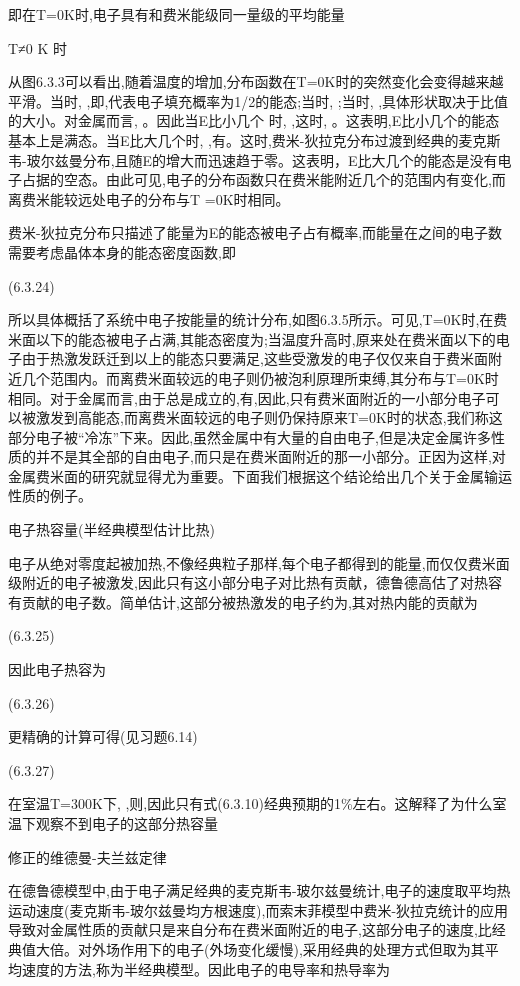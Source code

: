 即在T=0K时,电子具有和费米能级同一量级的平均能量

T≠0 K 时

从图6.3.3可以看出,随着温度的增加,分布函数在T=0K时的突然变化会变得越来越平滑。当时, ,即,代表电子填充概率为1/2的能态;当时, ;当时, ,具体形状取决于比值的大小。对金属而言, 。因此当E比小几个 时, ,这时, 。这表明,E比小几个的能态基本上是满态。当E比大几个时, ,有。这时,费米-狄拉克分布过渡到经典的麦克斯韦-玻尔兹曼分布,且随E的增大而迅速趋于零。这表明，E比大几个的能态是没有电子占据的空态。由此可见,电子的分布函数只在费米能附近几个的范围内有变化,而离费米能较远处电子的分布与T =0K时相同。

费米-狄拉克分布只描述了能量为E的能态被电子占有概率,而能量在之间的电子数需要考虑晶体本身的能态密度函数,即

 	(6.3.24)



所以具体概括了系统中电子按能量的统计分布,如图6.3.5所示。可见,T=0K时,在费米面以下的能态被电子占满,其能态密度为;当温度升高时,原来处在费米面以下的电子由于热激发跃迁到以上的能态只要满足,这些受激发的电子仅仅来自于费米面附近几个范围内。而离费米面较远的电子则仍被泡利原理所束缚,其分布与T=0K时相同。对于金属而言,由于总是成立的,有,因此,只有费米面附近的一小部分电子可以被激发到高能态,而离费米面较远的电子则仍保持原来T=0K时的状态,我们称这部分电子被“冷冻”下来。因此,虽然金属中有大量的自由电子,但是决定金属许多性质的并不是其全部的自由电子,而只是在费米面附近的那一小部分。正因为这样,对金属费米面的研究就显得尤为重要。下面我们根据这个结论给出几个关于金属输运性质的例子。

电子热容量(半经典模型估计比热)

电子从绝对零度起被加热,不像经典粒子那样,每个电子都得到的能量,而仅仅费米面级附近的电子被激发,因此只有这小部分电子对比热有贡献，德鲁德高估了对热容有贡献的电子数。简单估计,这部分被热激发的电子约为,其对热内能的贡献为

 	(6.3.25)

因此电子热容为

	(6.3.26)

更精确的计算可得(见习题6.14)

 	(6.3.27)

在室温T=300K下, ,则,因此只有式(6.3.10)经典预期的1\%左右。这解释了为什么室温下观察不到电子的这部分热容量

修正的维德曼-夫兰兹定律

在德鲁德模型中,由于电子满足经典的麦克斯韦-玻尔兹曼统计,电子的速度取平均热运动速度(麦克斯韦-玻尔兹曼均方根速度),而索末菲模型中费米-狄拉克统计的应用导致对金属性质的贡献只是来自分布在费米面附近的电子,这部分电子的速度,比经典值大倍。对外场作用下的电子(外场变化缓慢),采用经典的处理方式但取为其平均速度的方法,称为半经典模型。因此电子的电导率和热导率为

